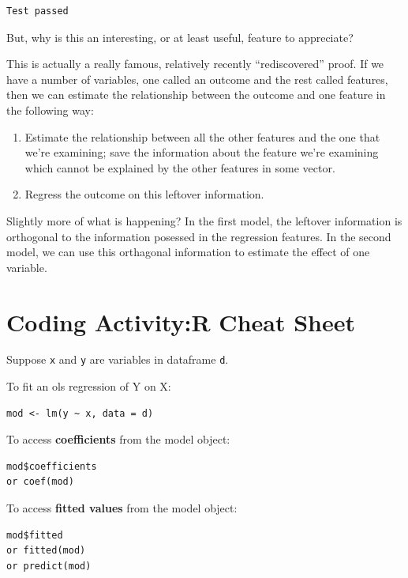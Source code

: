 \documentclass[
  letterpaper,
  DIV=11,
  numbers=noendperiod]{scrreprt}
\providecommand{\tightlist}{%
  \setlength{\itemsep}{0pt}\setlength{\parskip}{0pt}}\usepackage{longtable,booktabs,array}
\begin{document}
\begin{verbatim}
Test passed 
\end{verbatim}

But, why is this an interesting, or at least useful, feature to
appreciate?

This is actually a really famous, relatively recently ``rediscovered''
proof. If we have a number of variables, one called an outcome and the
rest called features, then we can estimate the relationship between the
outcome and one feature in the following way:

\begin{enumerate}
\def\labelenumi{\arabic{enumi}.}
\tightlist
\item
  Estimate the relationship between all the other features and the one
  that we're examining; save the information about the feature we're
  examining which cannot be explained by the other features in some
  vector.
\item
  Regress the outcome on this leftover information.
\end{enumerate}

Slightly more of what is happening? In the first model, the leftover
information is orthogonal to the information posessed in the regression
features. In the second model, we can use this orthagonal information to
estimate the effect of one variable.

\section{Coding Activity:R Cheat
Sheet}\label{coding-activityr-cheat-sheet}

Suppose \texttt{x} and \texttt{y} are variables in dataframe \texttt{d}.

To fit an ols regression of Y on X:

\begin{verbatim}
mod <- lm(y ~ x, data = d)
\end{verbatim}

To access \textbf{coefficients} from the model object:

\begin{verbatim}
mod$coefficients
or coef(mod)
\end{verbatim}

To access \textbf{fitted values} from the model object:

\begin{verbatim}
mod$fitted
or fitted(mod)
or predict(mod)
\end{verbatim}
\end{document}
